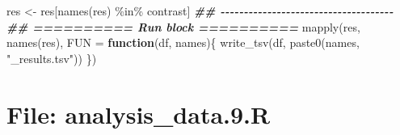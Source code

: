 \documentclass[
]{article}
\newenvironment{Shaded}{\begin{snugshade}}{\end{snugshade}}
\newcommand{\AttributeTok}[1]{\textcolor[rgb]{0.77,0.63,0.00}{#1}}
\newcommand{\ControlFlowTok}[1]{\textcolor[rgb]{0.13,0.29,0.53}{\textbf{#1}}}
\newcommand{\DocumentationTok}[1]{\textcolor[rgb]{0.56,0.35,0.01}{\textbf{\textit{#1}}}}
\newcommand{\FunctionTok}[1]{\textcolor[rgb]{0.00,0.00,0.00}{#1}}
\newcommand{\NormalTok}[1]{#1}
\newcommand{\OtherTok}[1]{\textcolor[rgb]{0.56,0.35,0.01}{#1}}
\newcommand{\SpecialCharTok}[1]{\textcolor[rgb]{0.00,0.00,0.00}{#1}}
\newcommand{\StringTok}[1]{\textcolor[rgb]{0.31,0.60,0.02}{#1}}
\begin{document}
\begin{Shaded}
\begin{Highlighting}[]
\NormalTok{res }\OtherTok{\textless{}{-}}\NormalTok{ res[}\FunctionTok{names}\NormalTok{(res) }\SpecialCharTok{\%in\%}\NormalTok{ contrast]}
\DocumentationTok{\#\# {-}{-}{-}{-}{-}{-}{-}{-}{-}{-}{-}{-}{-}{-}{-}{-}{-}{-}{-}{-}{-}{-}{-}{-}{-}{-}{-}{-}{-}{-}{-}{-}{-}{-}{-}{-}{-} }
\DocumentationTok{\#\# ========== Run block ========== }
\FunctionTok{mapply}\NormalTok{(res, }\FunctionTok{names}\NormalTok{(res), }
       \AttributeTok{FUN =} \ControlFlowTok{function}\NormalTok{(df, names)\{}
         \FunctionTok{write\_tsv}\NormalTok{(df, }\FunctionTok{paste0}\NormalTok{(names, }\StringTok{"\_results.tsv"}\NormalTok{))}
\NormalTok{              \})}
\end{Highlighting}
\end{Shaded}

\hypertarget{file-analysis_data.9.r}{%
\section{File: analysis\_data.9.R}\label{file-analysis_data.9.r}}
\end{document}
